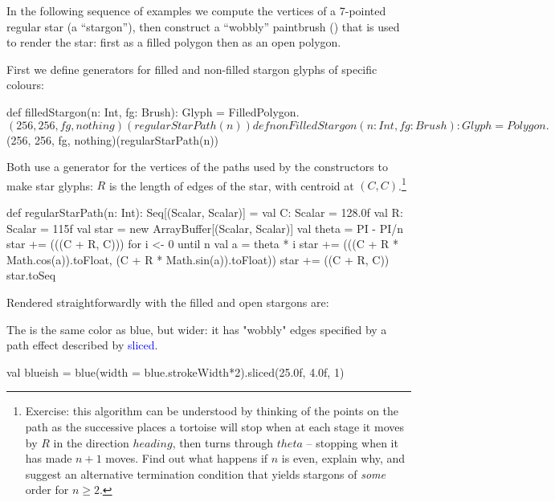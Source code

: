 \documentclass[12pt,a4paper]{article}
\def\Scala#1{\textcolor{blue}{\textsf{#1}}}
\begin{document}
In the following sequence of examples we compute the
vertices of a 7-pointed regular star (a ``stargon''), then construct
a ``wobbly'' paintbrush () that is used to render
the star: first  as a filled polygon then as an open polygon.


First we define generators for filled and non-filled stargon glyphs
of specific colours:

\begin{scala}
 def filledStargon(n: Int, fg: Brush): Glyph =
     FilledPolygon.$(256, 256, fg, nothing)(regularStarPath(n))                        
   
 def nonFilledStargon(n: Int, fg: Brush): Glyph =
     Polygon.$(256, 256, fg, nothing)(regularStarPath(n))                    
\end{scala}


Both use a generator for the vertices of the paths used by
the  constructors to make star glyphs: $R$ is the
length of edges of the star, with centroid at $(C,C)$.\footnote{Exercise: this
algorithm can be understood by thinking of the points on
the path as the successive places a tortoise will stop when
at each stage it moves by $R$ in the direction $heading$, then turns through
$theta$ -- stopping when it has made $n+1$ moves.
Find out what happens if $n$ is even, explain why, and suggest
an alternative termination condition that yields stargons of \textit{some} order for
$n\ge{}2$. }

\begin{scala}
def regularStarPath(n: Int): Seq[(Scalar, Scalar)] = {
    val C: Scalar = 128.0f
    val R: Scalar = 115f
    val star = new ArrayBuffer[(Scalar, Scalar)]
    val theta = PI - PI/n
    star += (((C + R, C)))
    for {i <- 0 until n} {
      val a = theta * i
      star += (((C + R * Math.cos(a)).toFloat, (C + R * Math.sin(a)).toFloat))
    }
    star += ((C + R, C))
    star.toSeq
  }
\end{scala}

Rendered straightforwardly with  the filled and open stargons are:
\begin{center}
\quad\quad
{}
\end{center}


 The   is the same color as blue, but wider: it
 has "wobbly" edges specified by a path effect described by \Scala{sliced}.

\begin{scala}
  val blueish =
        blue(width = blue.strokeWidth*2).sliced(25.0f, 4.0f, 1)
\end{scala}
\end{document}
